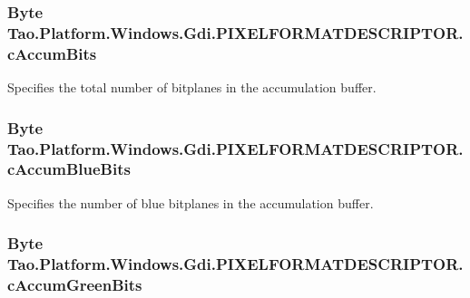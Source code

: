 \hypertarget{struct_tao_1_1_platform_1_1_windows_1_1_gdi_1_1_p_i_x_e_l_f_o_r_m_a_t_d_e_s_c_r_i_p_t_o_r_acaa9ebd6993b6d6058dd11739868c964}{
\subsubsection[{cAccumBits}]{\setlength{\rightskip}{0pt plus 5cm}Byte {\bf Tao.Platform.Windows.Gdi.PIXELFORMATDESCRIPTOR.cAccumBits}}}
\label{struct_tao_1_1_platform_1_1_windows_1_1_gdi_1_1_p_i_x_e_l_f_o_r_m_a_t_d_e_s_c_r_i_p_t_o_r_acaa9ebd6993b6d6058dd11739868c964}


Specifies the total number of bitplanes in the accumulation buffer. 

\hypertarget{struct_tao_1_1_platform_1_1_windows_1_1_gdi_1_1_p_i_x_e_l_f_o_r_m_a_t_d_e_s_c_r_i_p_t_o_r_acb16c445481897dd3d3c1892efd65fa5}{
\subsubsection[{cAccumBlueBits}]{\setlength{\rightskip}{0pt plus 5cm}Byte {\bf Tao.Platform.Windows.Gdi.PIXELFORMATDESCRIPTOR.cAccumBlueBits}}}
\label{struct_tao_1_1_platform_1_1_windows_1_1_gdi_1_1_p_i_x_e_l_f_o_r_m_a_t_d_e_s_c_r_i_p_t_o_r_acb16c445481897dd3d3c1892efd65fa5}


Specifies the number of blue bitplanes in the accumulation buffer. 

\hypertarget{struct_tao_1_1_platform_1_1_windows_1_1_gdi_1_1_p_i_x_e_l_f_o_r_m_a_t_d_e_s_c_r_i_p_t_o_r_a4ee69f197d75c41060f031b4189768a4}{
\subsubsection[{cAccumGreenBits}]{\setlength{\rightskip}{0pt plus 5cm}Byte {\bf Tao.Platform.Windows.Gdi.PIXELFORMATDESCRIPTOR.cAccumGreenBits}}}
\label{struct_tao_1_1_platform_1_1_windows_1_1_gdi_1_1_p_i_x_e_l_f_o_r_m_a_t_d_e_s_c_r_i_p_t_o_r_a4ee69f197d75c41060f031b4189768a4}


